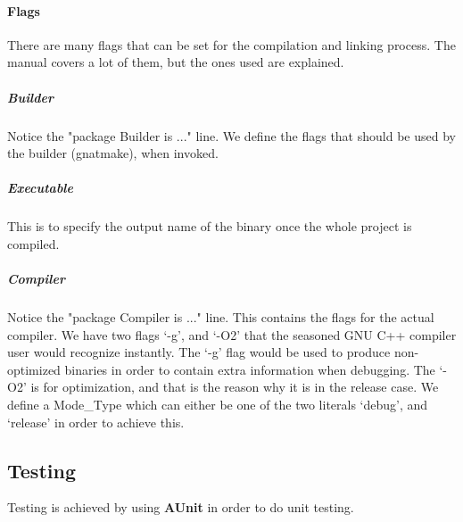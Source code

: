 

\paragraph{Flags} There are many flags that can be set for the compilation and linking process. The manual covers a lot of them, but the ones used are explained.

\subparagraph{Builder} Notice the "package Builder is ..." line. We define the flags that should be used by the builder (gnatmake), when invoked.

\subparagraph{Executable} This is to specify the output name of the binary once the whole project is compiled.

\subparagraph{Compiler} Notice the "package Compiler is ..." line. This contains the flags for the actual compiler. We have two flags `-g', and `-O2' that the seasoned GNU C++ compiler user would recognize instantly. The `-g' flag would be used to produce non-optimized binaries in order to contain extra information when debugging. 
The `-O2' is for optimization, and that is the reason why it is in the release case. We define a Mode\_Type which can either be one of the two literals `debug', and `release' in order to achieve this. 

\subsection{Testing}
Testing is achieved by using \textbf{AUnit} in order to do unit testing. 
